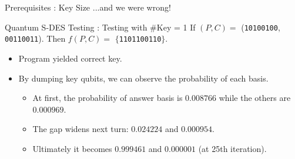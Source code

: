 \documentclass{beamer}
\begin{document}
    \begin{frame}{Prerequisites : Key Size}
        ...and we were wrong!
    \end{frame}

    \begin{frame}{Quantum S-DES Testing : Testing with \#Key = 1}
        If $ (P, C) =$ (\texttt{10100100}, \texttt{00110011}). Then $ f(P, C) = $  $\{$\texttt{1101100110}$\}$.
        \begin{itemize}
            \item Program yielded correct key.
            \item By dumping key qubits, we can observe the probability of each basis.
            \begin{itemize}
                \item At first, the probability of answer basis is $ 0.008766 $ while the others are $ 0.000969 $.
                \item The gap widens next turn: $ 0.024224 $ and $ 0.000954 $.
                \item Ultimately it becomes $ 0.999461 $ and $ 0.000001 $ (at 25th iteration).
            \end{itemize}
        \end{itemize}
    \end{frame}
\end{document}
